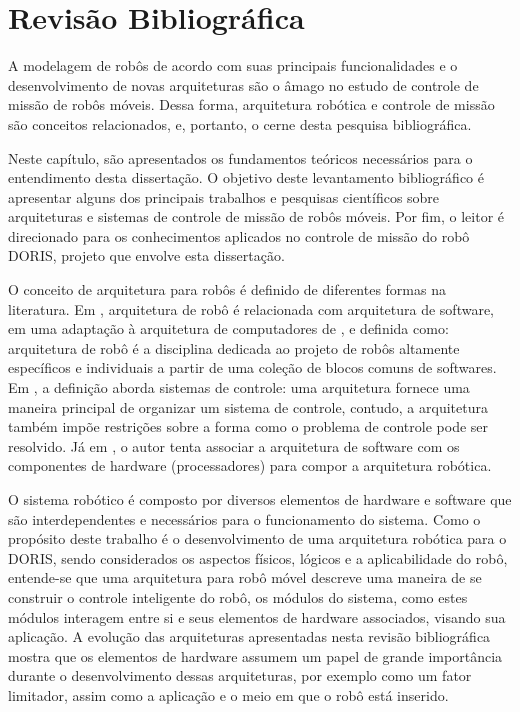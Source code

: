 \chapter{Revisão Bibliográfica}

A modelagem de robôs de acordo com suas principais funcionalidades e o
desenvolvimento de novas arquiteturas são o âmago no estudo de
controle de missão de robôs móveis. Dessa forma, arquitetura robótica e controle
de missão são conceitos relacionados, e, portanto, o cerne desta pesquisa
bibliográfica. 

Neste capítulo, são apresentados os fundamentos teóricos necessários para o
entendimento desta dissertação. O objetivo deste levantamento bibliográfico é
apresentar alguns dos principais trabalhos e pesquisas científicos sobre
arquiteturas e sistemas de controle de missão de robôs móveis. Por fim,
o leitor é direcionado para os conhecimentos aplicados no controle de missão do
robô DORIS, projeto que envolve esta dissertação.

O conceito de arquitetura %
 para robôs é definido de diferentes formas na
literatura. Em \cite{arkin1998behavior}, arquitetura de robô é
relacionada com arquitetura de software, em uma adaptação à
arquitetura de computadores de \cite{stone1980introduction}, e definida como:
arquitetura de robô é a disciplina dedicada ao projeto de robôs altamente específicos e individuais
a partir de uma coleção de blocos comuns de softwares.
Em \cite{mataric1992behavior}, a definição aborda sistemas de controle: uma
arquitetura fornece uma maneira principal de organizar um
sistema de controle, contudo, a arquitetura também impõe restrições sobre a
forma como o problema de controle pode ser resolvido. Já
em \cite{brooks1986robust}, o autor tenta associar a arquitetura de software
com os componentes de hardware (processadores) para compor a arquitetura
robótica.

O sistema robótico é composto por diversos elementos de hardware e
software que são interdependentes e necessários para o funcionamento do sistema.
Como o propósito deste trabalho é o desenvolvimento de uma arquitetura robótica
para o DORIS, sendo considerados os aspectos físicos, lógicos e a aplicabilidade do
robô, entende-se que uma arquitetura para robô móvel descreve uma maneira de se construir o
controle inteligente do robô, os módulos do sistema, como estes
módulos interagem entre si e seus elementos de hardware associados, visando sua
aplicação. A evolução das arquiteturas apresentadas nesta revisão
bibliográfica mostra que os elementos de hardware assumem um papel de grande
importância durante o desenvolvimento dessas arquiteturas, por exemplo como um
fator limitador, assim como a aplicação e o meio em que o robô está inserido.

